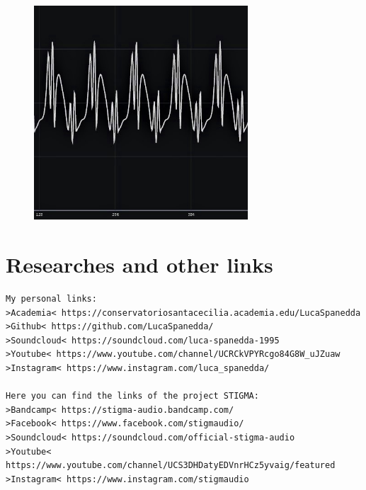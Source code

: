 \documentclass[12pt,landscape]{article}
\begin{document}
{\begin{center}
\begin{figure}[!htb]
\endminipage\hfill
{}%
  \includegraphics[width=8cm]{osc2.jpg}

\endminipage
\end{figure}

\clearpage


\section*{Researches and other links}

\begin{verbatim}
My personal links:
>Academia< https://conservatoriosantacecilia.academia.edu/LucaSpanedda
>Github< https://github.com/LucaSpanedda/
>Soundcloud< https://soundcloud.com/luca-spanedda-1995
>Youtube< https://www.youtube.com/channel/UCRCkVPYRcgo84G8W_uJZuaw
>Instagram< https://www.instagram.com/luca_spanedda/

Here you can find the links of the project STIGMA:
>Bandcamp< https://stigma-audio.bandcamp.com/
>Facebook< https://www.facebook.com/stigmaudio/
>Soundcloud< https://soundcloud.com/official-stigma-audio
>Youtube< https://www.youtube.com/channel/UCS3DHDatyEDVnrHCz5yvaig/featured
>Instagram< https://www.instagram.com/stigmaudio
\end{verbatim}

\clearpage

\end{center}
}
\end{document}
